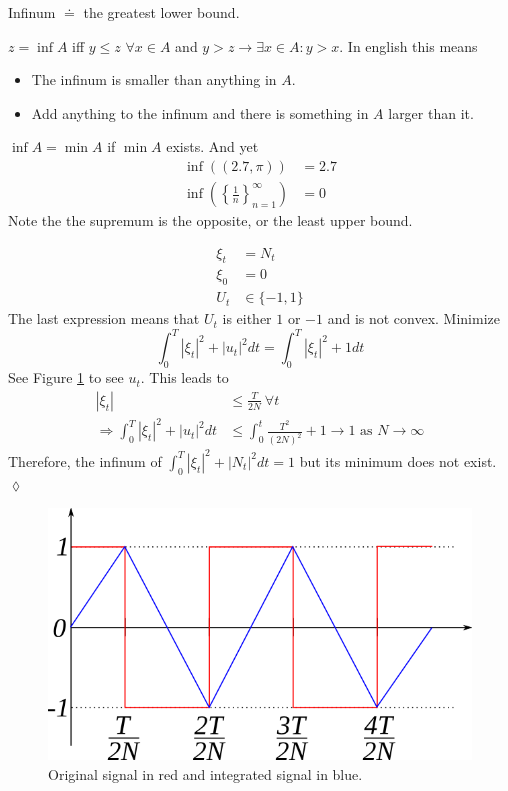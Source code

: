 \begin{definition}
Infinum $\doteq$ the greatest lower bound.
\end{definition}

$z = \inf A$ iff $y\leq z$ $\forall x\in A$ and $y>z\to\exists x\in A: y>x$. In english this means
\begin{itemize}
\item The infinum is smaller than anything in $A$.
\item Add anything to the infinum and there is something in $A$ larger than it.
\end{itemize}
$\inf A = \min A$ if $\min A$ exists. And yet
\begin{align*}
\inf((2.7,\pi)) &= 2.7 \\
\inf\left(\left\lbrace\frac{1}{n}\right\rbrace_{n=1}^\infty\right) &= 0
\end{align*}
Note the the supremum is the opposite, or the least upper bound.

\begin{example}
\begin{align*}
\xi_t &= N_t \\
\xi_0 &= 0 \\
U_t&\in\{-1,1\}
\end{align*}
The last expression means that $U_t$ is either $1$ or $-1$ and is not convex. Minimize
$$\int_0^T|\xi_t|^2 + |u_t|^2dt = \int_0^T|\xi_t|^2 + 1dt$$
See Figure \ref{fig:04signal} to see $u_t$. This leads to
\begin{align*}
|\xi_t| &\leq \frac{T}{2N} ~\forall t \\
\Rightarrow \int_0^T|\xi_t|^2+|u_t|^2dt &\leq \int_0^t\frac{T^2}{(2N)^2} + 1 \to 1 \text{ as } N\to\infty
\end{align*}
Therefore, the infinum of $\int_0^T|\xi_t|^2+|N_t|^2dt = 1$ but its minimum does not exist.
$\lozenge$
\end{example}

\begin{figure}[ht!]
	\centering
	\includegraphics[width=.4\textwidth]{images/04signal}
	\caption{Original signal in red and integrated signal in blue.}
	\label{fig:04signal}
\end{figure}

